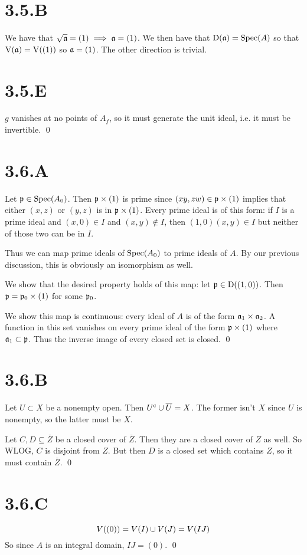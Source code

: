 \documentclass{article}
\begin{document}
\section{3.5.B}
We have that $\sqrt{\mathfrak{a}}=(1) \implies \mathfrak{a}=(1)$. We then have that $\operatorname{D}(\mathfrak{a})=\operatorname{Spec}(A)$
so that $\operatorname{V}(\mathfrak{a})=\operatorname{V}((1))$ so $\mathfrak{a}=(1)$. The other direction
is trivial.

\section{3.5.E}
$g$ vanishes at no points of $A_f$, so it
must generate the unit ideal, i.e. it must be invertible. \qed

\section{3.6.A}
Let $\mathfrak{p} \in \operatorname{Spec}(A_0)$. Then $\mathfrak{p} \times (1)$ is prime since
$(xy,zw) \in \mathfrak{p} \times (1)$ implies that either $(x,z)$ or
$(y,z)$ is in $\mathfrak{p} \times (1)$. Every prime ideal is of
this form: if $I$ is a prime ideal and
$(x, 0) \in I$ and $(x,y) \not \in I$, then
$(1,0)(x, y) \in I$ but neither of those two can be in
$I$.

Thus we can map prime ideals of $\operatorname{Spec}(A_0)$ to prime ideals of
$A$. By our previous discussion, this is obviously an
isomorphism as well.

We show that the desired property holds of this map: let
$\mathfrak{p} \in \operatorname{D}((1,0))$. Then $\mathfrak{p} = \mathfrak{p}_0 \times (1)$ for some
$\mathfrak{p}_0$.

We show this map is continuous: every ideal of $A$ is of
the form $\mathfrak{a}_1 \times \mathfrak{a}_2$. A function in this set vanishes on every
prime ideal of the form $\mathfrak{p} \times (1)$ where $\mathfrak{a}_1 \subset \mathfrak{p}$.
Thus the inverse image of every closed set is closed. \qed

\section{3.6.B}
Let $U \subset X$ be a nonempty open. Then $U^{\text{c}} \cup \overline{U}=X$.
The former isn't $X$ since $U$ is
nonempty, so the latter must be $X$.

Let $C, D \subseteq \overline{Z}$ be a closed cover of $\overline{Z}$. Then
they are a closed cover of $Z$ as well. So WLOG,
$C$ is disjoint from $Z$. But then
$D$ is a closed set which contains $Z$,
so it must contain $\overline{Z}$. \qed

\section{3.6.C}
\[V((0))=V(I) \cup V(J)=V(IJ)\]
So since $A$ is an integral domain,
$IJ=(0)$. \qed
\end{document}
